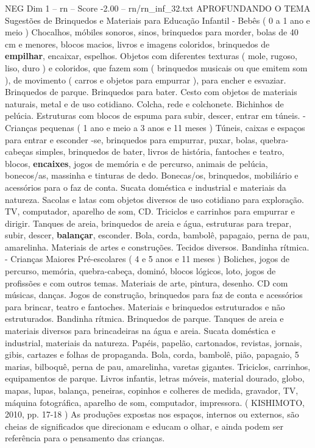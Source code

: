 \begin{textsample}{NEG Dim 1 – rn – Score -2.00 – rn/rn\_inf\_32.txt}  \label{ex:f1_neg_021}
APROFUNDANDO O TEMA Sugestões de Brinquedos e Materiais para Educação Infantil - Bebês ( 0 a 1 ano e meio ) Chocalhos, móbiles sonoros, sinos, brinquedos para morder, bolas de 40 cm e menores, blocos macios, livros e imagens coloridos, brinquedos de \textbf{empilhar}, encaixar, espelhos.
Objetos com diferentes texturas ( mole, rugoso, liso, duro ) e coloridos, que fazem som ( brinquedos musicais ou que emitem som ), de movimento ( carros e objetos para empurrar ), para encher e esvaziar.
Brinquedos de parque.
Brinquedos para bater.
Cesto com objetos de materiais naturais, metal e de uso cotidiano.
Colcha, rede e colchonete.
Bichinhos de pelúcia.
Estruturas com blocos de espuma para subir, descer, entrar em túneis. - Crianças pequenas ( 1 ano e meio a 3 anos e 11 meses ) Túneis, caixas e espaços para entrar e esconder -se, brinquedos para empurrar, puxar, bolas, quebra-cabeças simples, brinquedos de bater, livros de história, fantoches e teatro, blocos, \textbf{encaixes}, jogos de memória e de percurso, animais de pelúcia, bonecos/as, massinha e tinturas de dedo.
Bonecas/os, brinquedos, mobiliário e acessórios para o faz de conta.
Sucata doméstica e industrial e materiais da natureza.
Sacolas e latas com objetos diversos de uso cotidiano para exploração.
TV, computador, aparelho de som, CD.
Triciclos e carrinhos para empurrar e dirigir.
Tanques de areia, brinquedos de areia e água, estruturas para trepar, subir, descer, \textbf{balançar}, esconder.
Bola, corda, bambolê, papagaio, perna de pau, amarelinha.
Materiais de artes e construções.
Tecidos diversos.
Bandinha rítmica. - Crianças Maiores Pré-escolares ( 4 e 5 anos e 11 meses ) Boliches, jogos de percurso, memória, quebra-cabeça, dominó, blocos lógicos, loto, jogos de profissões e com outros temas.
Materiais de arte, pintura, desenho.
CD com músicas, danças.
Jogos de construção, brinquedos para faz de conta e acessórios para brincar, teatro e fantoches.
Materiais e brinquedos estruturados e não estruturados.
Bandinha rítmica.
Brinquedos de parque.
Tanques de areia e materiais diversos para brincadeiras na água e areia.
Sucata doméstica e industrial, materiais da natureza.
Papéis, papelão, cartonados, revistas, jornais, gibis, cartazes e folhas de propaganda.
Bola, corda, bambolê, pião, papagaio, 5 marias, bilboquê, perna de pau, amarelinha, varetas gigantes.
Triciclos, carrinhos, equipamentos de parque.
Livros infantis, letras móveis, material dourado, globo, mapas, lupas, balança, peneiras, copinhos e colheres de medida, gravador, TV, máquina fotográfica, aparelho de som, computador, impressora. ( KISHIMOTO, 2010, pp. 17-18 ) As produções expostas nos espaços, internos ou externos, são cheias de significados que direcionam e educam o olhar, e ainda podem ser referência para o pensamento das crianças.

\end{textsample}
